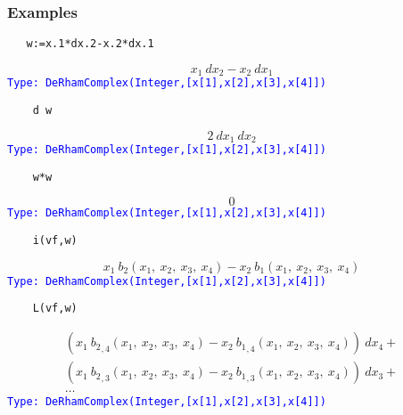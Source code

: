 \documentclass[12pt,a4paper]{article}
\newcommand{\type}[1]{\textcolor{blue}{\tt\tiny #1}}
\begin{document}
\subsubsection{Examples}
\begin{lstlisting}
   w:=x.1*dx.2-x.2*dx.1
\end{lstlisting}
\begin{displaymath}
  {{x _ {1}} \  {dx _ {2}}} -{{x _ {2}} \  {dx _ {1}}} 
\end{displaymath}    
\type{Type: DeRhamComplex(Integer,[x[1],x[2],x[3],x[4]])}
\begin{lstlisting}
    d w
\end{lstlisting}
\begin{displaymath}
  2 \  {dx _ {1}} \  {dx _ {2}} 
\end{displaymath}
\type{Type: DeRhamComplex(Integer,[x[1],x[2],x[3],x[4]])}
\begin{lstlisting}
    w*w
\end{lstlisting}
\begin{displaymath}
   0
\end{displaymath}
\type{Type: DeRhamComplex(Integer,[x[1],x[2],x[3],x[4]])}
\begin{lstlisting}
    i(vf,w)
\end{lstlisting}
\begin{displaymath}
   {{x _ {1}} \  {{b _ {2}} \left(
    {{x _ {1}}, \: {x _ {2}}, \: {x _ {3}}, \: {x _ {4}}} 
    \right)}}-{{x _ {2}} \  {{b _ {1}} 
    \left({{x _ {1}}, \: {x _ {2}}, \: {x _ {3}}, \: {x _ {4}}}\right)}}
\end{displaymath}
\type{Type: DeRhamComplex(Integer,[x[1],x[2],x[3],x[4]])}
\begin{lstlisting}
    L(vf,w)
\end{lstlisting}
\begin{eqnarray*}
    {{\left( {{x _ {1}} \  {{{b _ {2}} _ {{,4}}} 
    \left({{x _ {1}}, \: {x _ {2}}, \: {x _ {3}}, \: {x _ {4}}} 
    \right)}}-{{x _ {2}} \  {{{b _ {1}} _ {{,4}}} 
    \left({{x _ {1}}, \: {x _ {2}}, \: {x _ {3}}, \: {x _ {4}}} 
    \right)}}\right)}
    \  {dx _ {4}}}+ \\ {{\left( {{x _ {1}} \  {{{b _ {2}} _ {{,3}}} 
    \left({{x _ {1}}, \: {x _ {2}}, \: {x _ {3}}, \: {x _ {4}}} 
    \right)}}-{{x _ {2}} \  {{{b _ {1}} _ {{,3}}} 
    \left({{x _ {1}}, \: {x _ {2}}, \: {x _ {3}}, \: {x _ {4}}} 
    \right)}}\right)}
    \  {dx _ {3}}}+ \\ \ldots 
\end{eqnarray*}
\type{Type: DeRhamComplex(Integer,[x[1],x[2],x[3],x[4]])}
\end{document}
